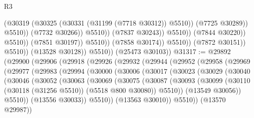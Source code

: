 \begin{lexlean}{R3}
\begin{coremodule}
                                                    (@30319
                                                      (@30325
                                                        (@30331 (@31199 (@7718 @30312)) @5510))
                                                      (@7725 @30289))
                                                    @5510))
                                                (@7732 @30266))
                                              @5510))
                                          (@7837 @30243))
                                        @5510))
                                    (@7844 @30220))
                                  @5510))
                              (@7851 @30197))
                            @5510))
                        (@7858 @30174))
                      @5510))
                  (@7872 @30151))
                @5510))
            (@13528 @30128))
          @5510))
      (@25473 @30103))
@31317 := @29892
    (@29900
      (@29906
        (@29918
          (@29926
            (@29932
              (@29944
                (@29952
                  (@29958
                    (@29969
                      (@29977
                        (@29983
                          (@29994
                            (@30000
                              (@30006
                                (@30017
                                  (@30023
                                    (@30029
                                      (@30040
                                        (@30046
                                          (@30052
                                            (@30063
                                              (@30069
                                                (@30075
                                                  (@30087
                                                    (@30093
                                                      (@30099
                                                        (@30110
                                                          (@30118 (@31256 @5510))
                                                          (@5518 @800 @30080))
                                                        @5510))
                                                    (@13549 @30056))
                                                  @5510))
                                              (@13556 @30033))
                                            @5510))
                                        (@13563 @30010))
                                      @5510))
                                  (@13570 @29987))

\end{coremodule}
\end{lexlean}
